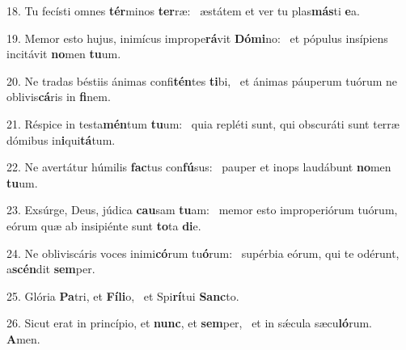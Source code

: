18. Tu fecísti omnes \textbf{tér}minos \textbf{ter}ræ: \ast\  æstátem et ver tu plas\textbf{más}ti \textbf{e}a.\

19. Memor esto hujus, inimícus imprope\textbf{rá}vit \textbf{Dó}\textbf{mi}no: \ast\  et pópulus insípiens incitávit \textbf{no}men \textbf{tu}um.\

20. Ne tradas béstiis ánimas confi\textbf{tén}tes \textbf{ti}bi, \ast\  et ánimas páuperum tuórum ne oblivis\textbf{cá}ris in \textbf{fi}nem.\

21. Réspice in testa\textbf{mén}tum \textbf{tu}um: \ast\  quia repléti sunt, qui obscuráti sunt terræ dómibus in\textbf{i}qui\textbf{tá}tum.\

22. Ne avertátur húmilis \textbf{fac}tus con\textbf{fú}sus: \ast\  pauper et inops laudábunt \textbf{no}men \textbf{tu}um.\

23. Exsúrge, Deus, júdica \textbf{cau}sam \textbf{tu}am: \ast\  memor esto improperiórum tuórum, eórum quæ ab insipiénte sunt \textbf{to}ta \textbf{di}e.\

24. Ne obliviscáris voces inimi\textbf{có}rum tu\textbf{ó}rum: \ast\  supérbia eórum, qui te odérunt, a\textbf{scén}dit \textbf{sem}per.\

25. Glória \textbf{Pa}tri, et \textbf{Fí}\textbf{li}o, \ast\  et Spi\textbf{rí}tui \textbf{Sanc}to.\

26. Sicut erat in princípio, et \textbf{nunc}, et \textbf{sem}per, \ast\  et in sǽcula sæcu\textbf{ló}rum. \textbf{A}men.\

